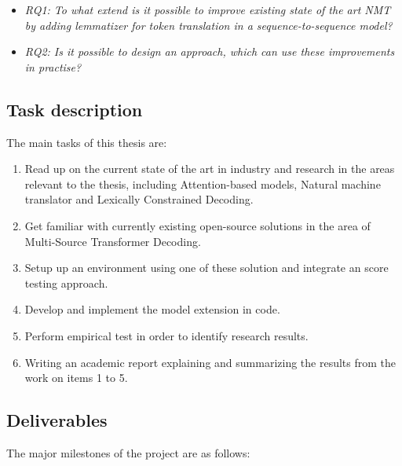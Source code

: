 \documentclass{task_description}
\begin{document}
\begin{itemize}
	\item \textit{RQ1: To what extend is it possible to improve existing state of the art NMT by adding lemmatizer for token translation in a sequence-to-sequence model?}
	\item \textit{RQ2: Is it possible to design an approach, which can use these improvements in practise?}
\end{itemize}  

%
\subsection*{Task description}
%

The main tasks of this thesis are:

\begin{enumerate}
	\item Read up on the current state of the art in industry and research in the areas relevant to the thesis, including Attention-based models, Natural machine translator and Lexically Constrained Decoding.
	\item Get familiar with currently existing open-source solutions in the area of Multi-Source Transformer Decoding.
	\item Setup up an environment using one of these solution and integrate an score testing approach. 
	\item Develop and implement the model extension in code.
	\item Perform empirical test in order to identify research results.
	\item Writing an academic report explaining and summarizing the results from the work on items 1 to 5.	
\end{enumerate}


\subsection*{Deliverables}
%


The major milestones of the project are as follows:
\end{document}
